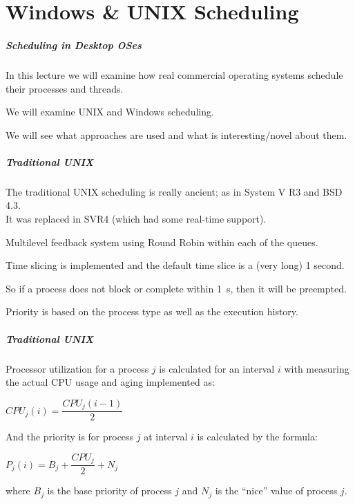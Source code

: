 \part{Windows \& UNIX Scheduling}

\begin{frame}
\partpage
\end{frame}

\begin{frame}
\frametitle{Scheduling in Desktop OSes}

In this lecture we will examine how real commercial operating systems schedule their processes and threads. 

We will examine UNIX and Windows scheduling. 

We will see what approaches are used and what is interesting/novel about them.


\end{frame}

\begin{frame}
\frametitle{Traditional UNIX}

The traditional UNIX scheduling is really ancient; as in System V R3 and BSD 4.3.\\
\quad It was replaced in SVR4 (which had some real-time support).

Multilevel feedback system using Round Robin within each of the queues. 

Time slicing is implemented and the default time slice is a (very long) 1 second. 

So if a process does not block or complete within 1~s, then it will be preempted. 

Priority is based on the process type as well as the execution history.

\end{frame}

\begin{frame}
\frametitle{Traditional UNIX}

Processor utilization for a process $j$ is calculated for an interval $i$ with measuring the actual CPU usage and aging implemented as:

\begin{center}
$CPU_{j}(i) = \dfrac{CPU_{j}(i - 1)}{2}$
\end{center}

And the priority is for process $j$ at interval $i$ is calculated by the formula:

\begin{center}
$P_{j}(i) = B_{j} + \dfrac{CPU_{j}}{2} + N_{j}$
\end{center}

where $B_{j}$ is the base priority of process $j$ and $N_{j}$ is the ``nice'' value of process $j$.


\end{frame}

